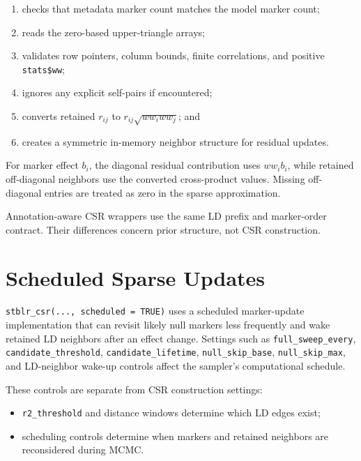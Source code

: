 \documentclass[
  11pt,
  letterpaper,
  DIV=11,
  numbers=noendperiod]{scrartcl}
\providecommand{\tightlist}{%
  \setlength{\itemsep}{0pt}\setlength{\parskip}{0pt}}
\begin{document}
\begin{enumerate}
\def\labelenumi{\arabic{enumi}.}
\tightlist
\item
  checks that metadata marker count matches the model marker count;
\item
  reads the zero-based upper-triangle arrays;
\item
  validates row pointers, column bounds, finite correlations, and
  positive \texttt{stats\$ww};
\item
  ignores any explicit self-pairs if encountered;
\item
  converts retained \(r_{ij}\) to \(r_{ij}\sqrt{ww_iww_j}\); and
\item
  creates a symmetric in-memory neighbor structure for residual updates.
\end{enumerate}

For marker effect \(b_i\), the diagonal residual contribution uses
\(ww_i b_i\), while retained off-diagonal neighbors use the converted
cross-product values. Missing off-diagonal entries are treated as zero
in the sparse approximation.

Annotation-aware CSR wrappers use the same LD prefix and marker-order
contract. Their differences concern prior structure, not CSR
construction.

\section{Scheduled Sparse Updates}\label{scheduled-sparse-updates}

\texttt{stblr\_csr(...,\ scheduled\ =\ TRUE)} uses a scheduled
marker-update implementation that can revisit likely null markers less
frequently and wake retained LD neighbors after an effect change.
Settings such as \texttt{full\_sweep\_every},
\texttt{candidate\_threshold}, \texttt{candidate\_lifetime},
\texttt{null\_skip\_base}, \texttt{null\_skip\_max}, and LD-neighbor
wake-up controls affect the sampler's computational schedule.

These controls are separate from CSR construction settings:

\begin{itemize}
\tightlist
\item
  \texttt{r2\_threshold} and distance windows determine which LD edges
  exist;
\item
  scheduling controls determine when markers and retained neighbors are
  reconsidered during MCMC.
\end{itemize}
\end{document}
